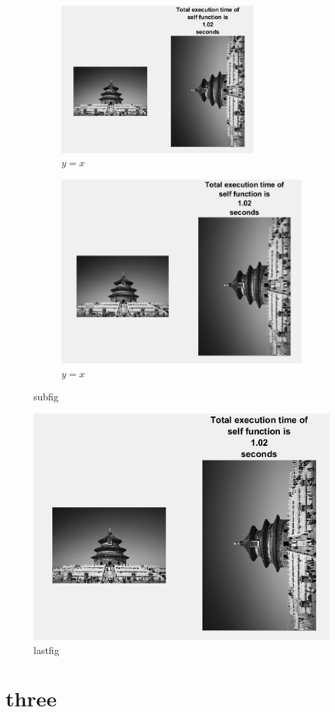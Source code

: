 \documentclass{article}
\begin{document}
\begin{figure}
	\centering
	\begin{subfigure}[!htbp]{0.5\textwidth}
		\centering
		\includegraphics[width=0.8\textwidth]{selfRot.png}
		\caption{$y=x$}
		\label{fig:y equals x}
	\end{subfigure}
	\hfill
\begin{subfigure}[!htpb]{0.3\textwidth}
	\centering
	\includegraphics[width=\textwidth]{selfRot.png}
	\caption{$y=x$}
	\label{fig:y equals x}
\end{subfigure}
\caption{subfig}
\end{figure}
\clearpage
\begin{figure}[!bthp]
	\includegraphics[width=\textwidth]{selfRot.png}
	\caption{lastfig}
\end{figure}
\section{three}
\end{document}
